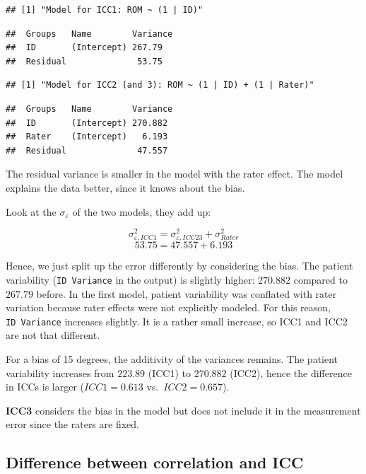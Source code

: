 \documentclass[
]{book}
\begin{document}
\begin{verbatim}
## [1] "Model for ICC1: ROM ~ (1 | ID)"
\end{verbatim}

\begin{verbatim}
##  Groups   Name        Variance
##  ID       (Intercept) 267.79  
##  Residual              53.75
\end{verbatim}

\begin{verbatim}
## [1] "Model for ICC2 (and 3): ROM ~ (1 | ID) + (1 | Rater)"
\end{verbatim}

\begin{verbatim}
##  Groups   Name        Variance
##  ID       (Intercept) 270.882 
##  Rater    (Intercept)   6.193 
##  Residual              47.557
\end{verbatim}

The residual variance is smaller in the model with the rater effect.
The model explains the data better, since it knows about the bias.

Look at the \(\sigma_{\varepsilon}\) of the two models, they add up:

\[\sigma_{\varepsilon, ICC1}^2 = \sigma_{\varepsilon, ICC23}^2 + \sigma_{Rater}^2\]
\[53.75 = 47.557 + 6.193\]

Hence, we just split up the error differently by considering the bias.
The patient variability (\texttt{ID\ Variance} in the output) is slightly higher:
\(270.882\) compared to \(267.79\) before.
In the first model, patient variability was conflated with rater variation because rater effects
were not explicitly modeled. For this reason, \texttt{ID\ Variance} increases slightly.
It is a rather small increase, so ICC1 and ICC2 are not that different.

For a bias of 15 degrees, the additivity of the variances remains.
The patient variability increases from \(223.89\) (ICC1) to \(270.882\) (ICC2),
hence the difference in ICCs is larger (\(ICC1=0.613\) vs.~\(ICC2=0.657\)).

\textbf{ICC3} considers the bias in the model but does not include it in the measurement
error since the raters are fixed.

\subsection{Difference between correlation and ICC}\label{difference-between-correlation-and-icc}
\end{document}
